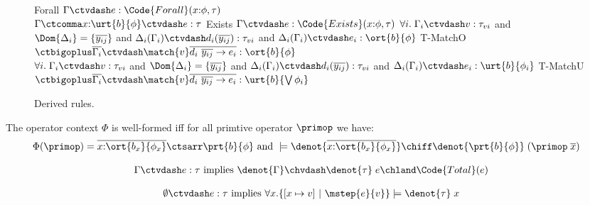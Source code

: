 \begin{figure}[h!]
{{Forall}
{$\Gamma \ctvdash e : \Code{Forall}(x{:}\phi, \tau)$}
\\[.8em]
\mprooftr{35mm}
{$\Gamma \ctcomma x{:}\urt{b}{\phi} \ctvdash e : \tau$}
{Exists}
{$\Gamma \ctvdash e : \Code{Exists}(x{:}\phi, \tau)$}
\quad
\mprooftr{65mm}
{$\forall i.\;\Gamma_i \ctvdash v : \tau_{vi}$  and $\Dom{\Delta_i} = \{\overline{y_{ij}}\}$ and  $\Delta_i(\Gamma_i) \ctvdash d_i(\overline{y_{ij}}) : \tau_{vi}$ and $\Delta_i(\Gamma_i) \ctvdash e_i : \ort{b}{\phi}$ }
  {T-MatchO}
  {$\ctbigoplus \overline{\Gamma_i} \ctvdash \match{v} \overline{d_i\ \overline{y_{ij}} \to e_i}  : \ort{b}{\phi}$}
  \\[.8em]
\mprooftr{65mm}
  {$\forall i.\;\Gamma_i \ctvdash v : \tau_{vi}$  and $\Dom{\Delta_i} = \{\overline{y_{ij}}\}$ and  $\Delta_i(\Gamma_i) \ctvdash d_i(\overline{y_{ij}}) : \tau_{vi}$ and $\Delta_i(\Gamma_i) \ctvdash e_i : \urt{b}{\phi_i}$ }
  {T-MatchU}
  {$\ctbigoplus \overline{\Gamma_i} \ctvdash \match{v} \overline{d_i\ \overline{y_{ij}} \to e_i}  : \urt{b}{\bigvee \phi_i}$}
}
	\caption{Derived rules.}
\label{fig:declaritive-typing-rules}
\vspace*{-.1in}
\end{figure}

\begin{theorem} The operator context $\Phi$ is well-formed iff for all primtive operator $\primop$ we have:
{\begin{align*}
    &\Phi(\primop) = \overline{x{:}\ort{b_x}{\phi_x}}\ctsarr \prt{b}{\phi} \text{ and } \models \denot{\overline{x{:}\ort{b_x}{\phi_x}}} \chiff \denot{\prt{b}{\phi}}\; (\primop\;\overline{x})
  \end{align*}}\noindent
\end{theorem}

\begin{theorem}
  \begin{align*}
    \Gamma \ctvdash e : \tau \text{ implies } \denot{\Gamma} \chvdash \denot{\tau}\;e \chland \Code{Total}(e)
  \end{align*}\noindent
\end{theorem}

\begin{theorem}
  \begin{align*}
    \emptyset \ctvdash e : \tau \text{ implies } \forall x. \{[x\mapsto v] ~|~ \mstep{e}{v}\} \models \denot{\tau}\; x
  \end{align*}\noindent
\end{theorem}


